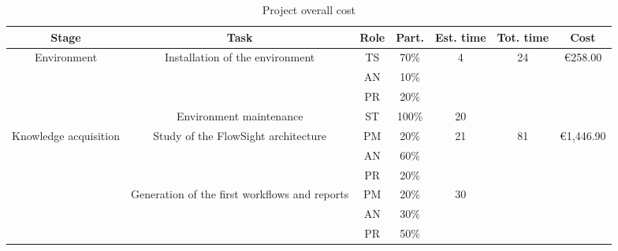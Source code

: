 \begin{table}[p]
\caption{Project overall cost}
\begin{center}
\scalebox{0.58}
{
\begin{tabular}{|c|l|c|c|l|l|l|}
\hline
\textbf{Stage} & \multicolumn{1}{c|}{\textbf{Task}} & \textbf{Role} & \textbf{Part.} & \multicolumn{1}{c|}{\textbf{Est. time}} & \multicolumn{1}{c|}{\textbf{Tot. time}} & \multicolumn{1}{c|}{\textbf{Cost}} \\ \hline
\multicolumn{ 1}{|c|}{Environment} & \multicolumn{ 1}{c|}{Installation of the environment} & TS & 70\% & \multicolumn{ 1}{c|}{4} & \multicolumn{ 1}{c|}{24} & \multicolumn{ 1}{c|}{\textgreek{\euro}258.00} \\ \cline{ 3- 4}
\multicolumn{ 1}{|c|}{} & \multicolumn{ 1}{l|}{} & AN & 10\% & \multicolumn{ 1}{l|}{} & \multicolumn{ 1}{l|}{} & \multicolumn{ 1}{l|}{} \\ \cline{ 3- 4}
\multicolumn{ 1}{|c|}{} & \multicolumn{ 1}{l|}{} & PR & 20\% & \multicolumn{ 1}{l|}{} & \multicolumn{ 1}{l|}{} & \multicolumn{ 1}{l|}{} \\ \cline{ 2- 5}
\multicolumn{ 1}{|l|}{} & \multicolumn{1}{c|}{Environment maintenance} & ST & 100\% & \multicolumn{1}{c|}{20} & \multicolumn{ 1}{l|}{} & \multicolumn{ 1}{l|}{} \\ \hline
\multicolumn{ 1}{|c|}{Knowledge acquisition} & \multicolumn{ 1}{c|}{Study of the FlowSight architecture} & PM & 20\% & \multicolumn{ 1}{c|}{21} & \multicolumn{ 1}{c|}{81} & \multicolumn{ 1}{c|}{\textgreek{\euro}1,446.90} \\ \cline{ 3- 4}
\multicolumn{ 1}{|c|}{} & \multicolumn{ 1}{l|}{} & AN & 60\% & \multicolumn{ 1}{l|}{} & \multicolumn{ 1}{l|}{} & \multicolumn{ 1}{l|}{} \\ \cline{ 3- 4}
\multicolumn{ 1}{|c|}{} & \multicolumn{ 1}{l|}{} & PR & 20\% & \multicolumn{ 1}{l|}{} & \multicolumn{ 1}{l|}{} & \multicolumn{ 1}{l|}{} \\ \cline{ 2- 5}
\multicolumn{ 1}{|c|}{} & \multicolumn{ 1}{c|}{Generation of the first workflows and reports} & PM & 20\% & \multicolumn{ 1}{c|}{30} & \multicolumn{ 1}{l|}{} & \multicolumn{ 1}{l|}{} \\ \cline{ 3- 4}
\multicolumn{ 1}{|c|}{} & \multicolumn{ 1}{l|}{} & AN & 30\% & \multicolumn{ 1}{l|}{} & \multicolumn{ 1}{l|}{} & \multicolumn{ 1}{l|}{} \\ \cline{ 3- 4}
\multicolumn{ 1}{|c|}{} & \multicolumn{ 1}{l|}{} & PR & 50\% & \multicolumn{ 1}{l|}{} & \multicolumn{ 1}{l|}{} & \multicolumn{ 1}{l|}{} \\ \cline{ 2- 5}

\end{tabular}}
\end{center}
\end{table}
